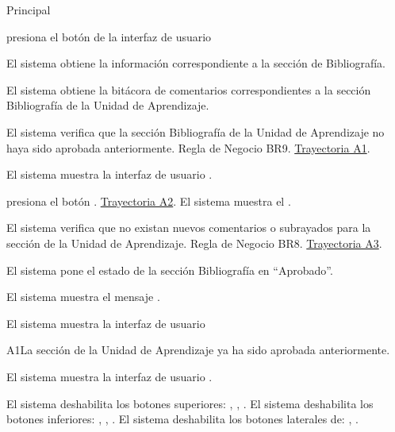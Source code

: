\begin{UCtrayectoria}{Principal}

    \UCpaso[\UCactor] presiona el botón   de la interfaz de usuario 

    \UCpaso El sistema obtiene la información correspondiente a la sección de Bibliografía.
    
    \UCpaso El sistema obtiene la bitácora de comentarios correspondientes a la sección Bibliografía de la Unidad de Aprendizaje. 
    
    \UCpaso El sistema verifica que la sección Bibliografía de la Unidad de Aprendizaje no haya sido aprobada anteriormente. Regla de Negocio BR9. \hyperlink{SP2-CU10-A1}{Trayectoria A1}. 
    
    \UCpaso El sistema muestra la interfaz de usuario  . 
    
    \UCpaso[\UCactor] presiona el botón . \hyperlink{SP2-CU10-A2}{Trayectoria A2}.
    \UCpaso El sistema muestra el .
    
    \UCpaso	El sistema verifica que no existan nuevos comentarios o subrayados para la sección de la Unidad de Aprendizaje. Regla de Negocio BR8. \hyperlink{SP2-CU10-A3}{Trayectoria A3}. 
    
    \UCpaso El sistema pone el estado de la sección Bibliografía en “Aprobado”.
    
    \UCpaso El sistema muestra el mensaje .

    \UCpaso El sistema muestra la interfaz de usuario 

\end{UCtrayectoria}


\begin{UCtrayectoriaA}{A1}{La sección de la Unidad de Aprendizaje ya ha sido aprobada anteriormente.}

	\hypertarget{SP2-CU10-A1}{\UCpaso El sistema muestra la interfaz de usuario .}
    \UCpaso El sistema deshabilita los botones superiores: , , .
    \UCpaso El sistema deshabilita los botones inferiores: , , .
    \UCpaso El sistema deshabilita los botones laterales de: , .
\end{UCtrayectoriaA}

